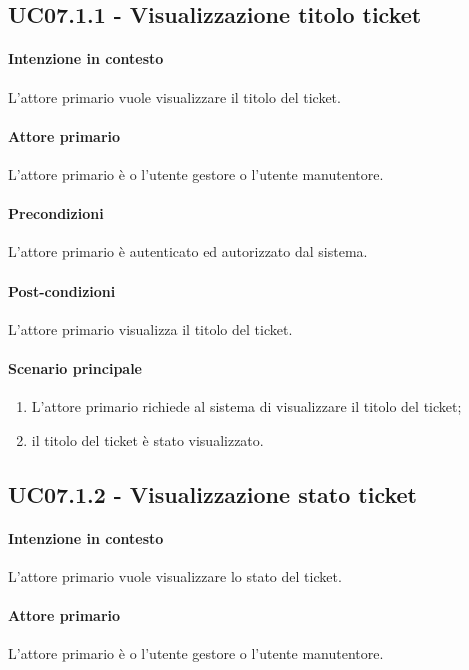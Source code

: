 \subsection{UC07.1.1 - Visualizzazione titolo ticket}\label{uc:07.1.1}

\paragraph{Intenzione in contesto} L'attore primario vuole visualizzare il titolo del ticket.
\paragraph{Attore primario} L'attore primario è o l'utente gestore o l'utente manutentore.
\paragraph{Precondizioni} L'attore primario è autenticato ed autorizzato dal sistema.
\paragraph{Post-condizioni} L'attore primario visualizza il titolo del ticket.
\paragraph{Scenario principale}
\begin{enumerate}
    \item L'attore primario richiede al sistema di visualizzare il titolo del ticket;
    \item il titolo del ticket è stato visualizzato.
\end{enumerate}

\subsection{UC07.1.2 - Visualizzazione stato ticket}\label{uc:07.1.2}

\paragraph{Intenzione in contesto} L'attore primario vuole visualizzare lo stato del ticket.
\paragraph{Attore primario} L'attore primario è o l'utente gestore o l'utente manutentore.
